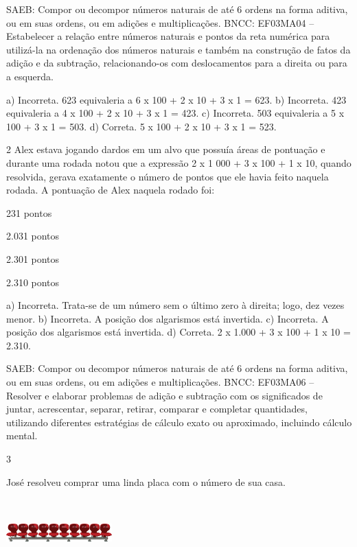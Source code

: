 \begin{multicols}{2}
\begin{enumerate}
{SAEB: Compor ou decompor números naturais de até 6 ordens na forma aditiva, ou em suas ordens, ou em adições e multiplicações.
BNCC: EF03MA04 -- Estabelecer a relação entre números naturais e pontos da reta numérica para
utilizá-la na ordenação dos números naturais e também na construção de fatos da adição e da
subtração, relacionando-os com deslocamentos para a direita ou para a esquerda.

a) Incorreta. 623 equivaleria a 6 x 100 + 2 x 10 + 3 x 1 = 623.
b) Incorreta. 423 equivaleria a 4 x 100 + 2 x 10 + 3 x 1 = 423.
c) Incorreta. 503 equivaleria a 5 x 100 + 3 x 1 = 503.
d) Correta. 5 x 100 + 2 x 10 + 3 x 1 = 523.

\num{2} Alex estava jogando dardos em um alvo que possuía áreas de pontuação e
durante uma rodada notou que a expressão 2 x 1 000 + 3 x 100 + 1 x 10,
quando resolvida, gerava exatamente o número de pontos que ele havia
feito naquela rodada. A pontuação de Alex naquela rodado foi:

\begin{escolha}
\item
  231 pontos
\item
  2.031 pontos
\item
  2.301 pontos
\item
  2.310 pontos
\end{escolha}

a) Incorreta. Trata-se de um número sem o último zero à direita; logo, dez vezes menor.
b) Incorreta. A posição dos algarismos está invertida.
c) Incorreta. A posição dos algarismos está invertida.
d) Correta. 2 x 1.000 + 3 x 100 + 1 x 10 = 2.310.


SAEB: Compor ou decompor números naturais de até 6 ordens na
forma aditiva, ou em suas ordens, ou em adições e multiplicações.
BNCC: EF03MA06 – Resolver e elaborar problemas de adição e subtração com os significados de
juntar, acrescentar, separar, retirar, comparar e completar quantidades, utilizando diferentes
estratégias de cálculo exato ou aproximado, incluindo cálculo mental.


\num{3}

José resolveu comprar uma linda placa com o número de sua casa.

\includegraphics[width=1.60256in,height=1.03072in]{media/image107.png}

}
\end{enumerate}
\end{multicols}
